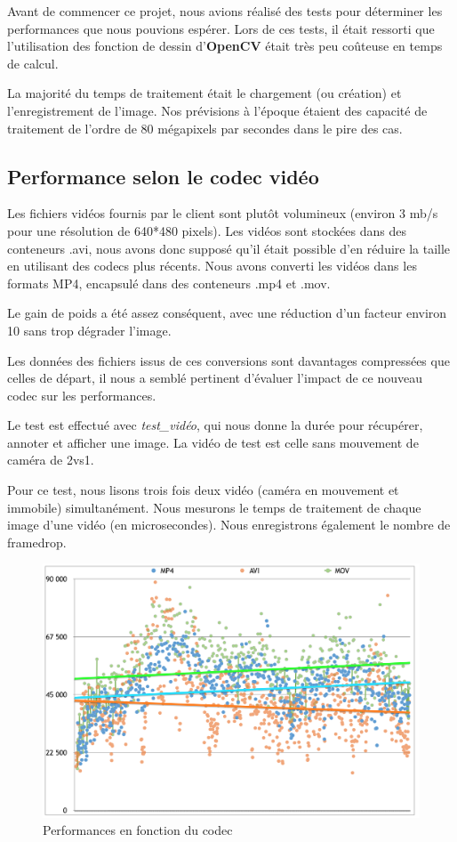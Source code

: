 Avant de commencer ce projet, nous avions réalisé des tests pour
déterminer les performances que nous pouvions espérer. Lors de
ces tests, il était ressorti que l'utilisation des fonction de
dessin d'\textbf{OpenCV} était très peu coûteuse en temps de
calcul. 
\bigskip

La majorité du temps de traitement était le chargement (ou
création) et l'enregistrement de l'image. Nos prévisions à
l'époque étaient des capacité de traitement de l'ordre de 80
mégapixels par secondes dans le pire des cas.  

\subsection{Performance selon le codec vidéo}

Les fichiers vidéos fournis par le client sont plutôt volumineux
(environ 3 mb/s pour une résolution de 640*480 pixels). Les
vidéos sont stockées dans des conteneurs .avi, nous avons donc
supposé qu'il était possible d'en réduire la taille en utilisant
des codecs plus récents. Nous avons converti les vidéos dans les
formats MP4, encapsulé dans des conteneurs .mp4 et .mov. 
\bigskip

Le gain de poids a été assez conséquent, avec une réduction d'un
facteur environ 10 sans trop dégrader l'image. 

Les données des fichiers issus de ces conversions sont davantages
compressées que celles de départ, il nous a semblé pertinent
d'évaluer l'impact de ce nouveau codec sur les performances. 
\bigskip

Le test est effectué avec \textit{test\_vidéo}, qui nous donne la
durée pour récupérer, annoter et afficher une image. La vidéo de
test est celle sans mouvement de caméra de 2vs1.
\bigskip

Pour ce test, nous lisons trois fois deux vidéo (caméra en
mouvement et immobile) simultanément. Nous mesurons le temps de
traitement de chaque image d'une vidéo (en microsecondes). Nous
enregistrons également le nombre de framedrop. 

\begin{figure}[H]  
\begin{center}  
\includegraphics[scale=0.4]{images/codec_performance.png}  
\caption{Performances en fonction du codec}
\end{center}
\end{figure}


